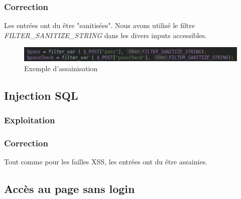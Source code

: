\documentclass[12pt]{article}
\begin{document}
\subsubsection{Correction}
Les entrées ont du être "sanitisées". Nous avons utilisé le filtre \textit{FILTER\_SANITIZE\_STRING} dans les divers inputs accessibles.
\begin{figure}[H]
\centering
\includegraphics[width=\linewidth]{images/sanitize.png}
\caption{Exemple d'assainisation}
\end{figure}

\subsection{Injection SQL}
\subsubsection{Exploitation}
\subsubsection{Correction}
Tout comme pour les failles XSS, les entrées ont du être assainies.


\subsection{Accès au page sans login}
\end{document}
